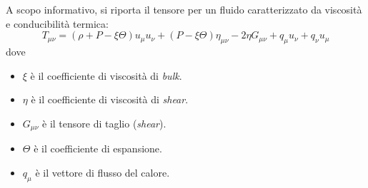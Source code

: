 A scopo informativo, si riporta il tensore per un fluido caratterizzato da viscosità e conducibilità termica:
\begin{equation*}
    T_{\mu\nu} = (\rho + P -\xi \Theta)u_\mu u_\nu + (P -\xi\Theta)\eta_{\mu\nu} -2\eta G_{\mu\nu} +q_\mu u_\nu + q_\nu u_\mu
\end{equation*}
dove
\begin{itemize}
    \item $\xi$ è il coefficiente di viscosità di \emph{bulk}.
    \item $\eta$ è il coefficiente di viscosità di \emph{shear}.
    \item $G_{\mu\nu}$ è il tensore di taglio (\emph{shear}).
    \item $\Theta$ è il coefficiente di espansione.
    \item $q_\mu$ è il vettore di flusso del calore.
\end{itemize}